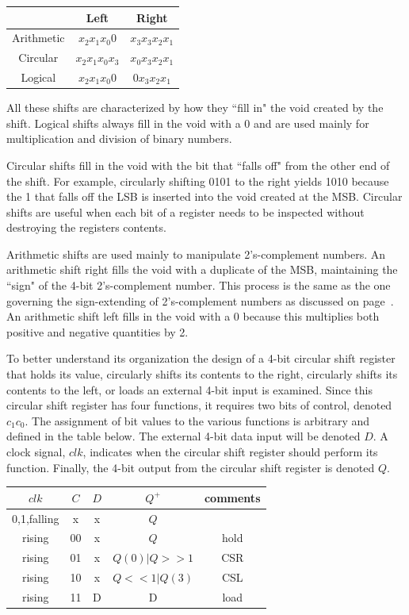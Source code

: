 \begin{tabular}{c|c|c}

		& Left			& Right		    \\ \hline
Arithmetic	& $x_2 x_1 x_0 0$		& $x_3 x_3 x_2 x_1$ \\ \hline
Circular	& $x_2 x_1 x_0 x_3$	& $x_0 x_3 x_2 x_1$ \\ \hline
Logical 	& $x_2 x_1 x_0 0$		& $0 x_3 x_2 x_1$   \\ 

\end{tabular}

All these shifts are characterized by how they ``fill in" the void created
by the shift.  Logical shifts always fill in the void with a 0 and are 
used mainly for multiplication and division of binary numbers.

Circular shifts fill in the void with the bit that ``falls off" from the other
end of the shift.  For example, circularly shifting 0101 to the right yields
1010 because the 1 that falls off the LSB is inserted into the void created 
at the MSB.  Circular shifts are useful when each bit of a register needs to be  
inspected without destroying the registers contents.

Arithmetic shifts are used mainly to manipulate 2's-complement 
numbers.  An arithmetic shift right fills the void with a duplicate of 
the MSB, maintaining the ``sign" of the 4-bit 2's-complement number.
This process is the same as the one governing the sign-extending of 
2's-complement numbers as discussed on page~\pageref{page:2sPad}. An 
arithmetic shift left fills in the void with a 0 because this multiplies 
both positive and negative quantities by 2.

To better understand its organization 
the design of a 4-bit circular shift register that holds 
its value, circularly shifts its contents to the right, circularly 
shifts its contents to the left, or loads an external 4-bit input
is examined.
Since this circular shift register has four functions, it requires 
two bits of control, denoted $c_1 c_0$.  The assignment of bit values to 
the various functions is arbitrary and defined in the table below.  
The external 4-bit data input will be denoted $D$.  A clock signal,
$clk$, indicates when the circular shift register should perform 
its function.  Finally, the 4-bit output from the circular shift 
register is denoted $Q$.

\begin{tabular}{c|c|c||c||c}

$clk$          & $C$  & $D$  & $Q^+$     & comments 	\\ \hline 
0,1,falling  & x  & x  & $Q$       &		\\ \hline
rising       & 00 & x  & $Q$       & hold	\\ \hline
rising       & 01 & x  & $Q(0)|Q>>1$ & CSR	\\ \hline
rising       & 10 & x  & $Q<<1|Q(3)$ & CSL	\\ \hline
rising       & 11 & D  & D         & load	\\ 

\end{tabular}

